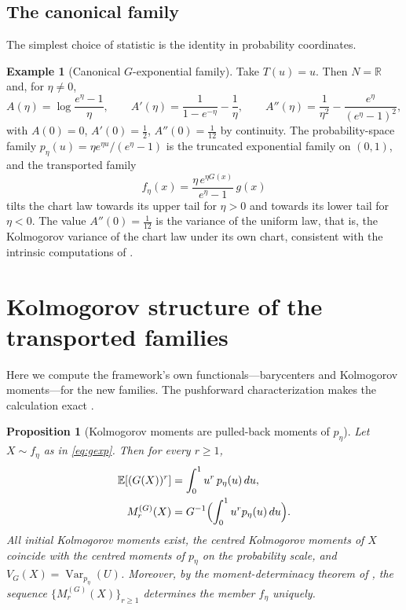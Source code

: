 \documentclass[11pt]{article}
\newtheorem{proposition}[theorem]{Proposition}
\theoremstyle{definition}
\newtheorem{example}[theorem]{Example}
\newcommand{\E}{\mathbb{E}}
\newcommand{\R}{\mathbb{R}}
\newcommand{\Var}{\operatorname{Var}}
\begin{document}
\subsection{The canonical family}

The simplest choice of statistic is the identity in probability
coordinates.

\begin{example}[Canonical $G$-exponential family]\label{ex:canonical}
Take $T(u)=u$. Then $N=\R$ and, for $\eta\neq0$,
\begin{equation}\label{eq:canonical-A}
A(\eta)=\log\frac{e^\eta-1}{\eta},
\qquad
A'(\eta)=\frac{1}{1-e^{-\eta}}-\frac1\eta,
\qquad
A''(\eta)=\frac{1}{\eta^2}-\frac{e^\eta}{(e^\eta-1)^2},
\end{equation}
with $A(0)=0$, $A'(0)=\tfrac12$, $A''(0)=\tfrac1{12}$ by continuity. The
probability-space family $p_\eta(u)=\eta e^{\eta u}/(e^\eta-1)$ is the
truncated exponential family on $(0,1)$, and the transported family
\[
f_\eta(x)=\frac{\eta\,e^{\eta G(x)}}{e^\eta-1}\,g(x)
\]
tilts the chart law towards its upper tail for $\eta>0$ and towards its
lower tail for $\eta<0$. The value $A''(0)=\tfrac1{12}$ is the variance of
the uniform law, that is, the Kolmogorov variance of the chart law under
its own chart, consistent with the intrinsic computations of
\cite{Cojocea2026a}.
\end{example}

\section{Kolmogorov structure of the transported families}
\label{sec:kolmogorov}

Here we compute the framework's own functionals---barycenters and
Kolmogorov moments---for the new families. The pushforward characterization
makes the calculation exact \cite{Cojocea2026a,Cojocea2026b}.

\begin{proposition}[Kolmogorov moments are pulled-back moments of
$p_\eta$]\label{prop:moments}
Let $X\sim f_\eta$ as in \eqref{eq:gexp}. Then for every $r\ge1$,
\[
\begin{aligned}
\E[(G(X))^r]
  &=\int_0^1 u^r\,p_\eta(u)\,du,\\
M_r^{(G)}(X)
  &=G^{-1}\Bigl(\int_0^1 u^r p_\eta(u)\,du\Bigr).
\end{aligned}
\]
All initial Kolmogorov moments exist, the centred Kolmogorov moments of
$X$ coincide with the centred moments of $p_\eta$ on the probability
scale, and $V_G(X)=\Var_{p_\eta}(U)$. Moreover, by the moment-determinacy
theorem of \cite{Cojocea2026a}, the sequence
$\{M_r^{(G)}(X)\}_{r\ge1}$ determines the member $f_\eta$ uniquely.
\end{proposition}
\end{document}
